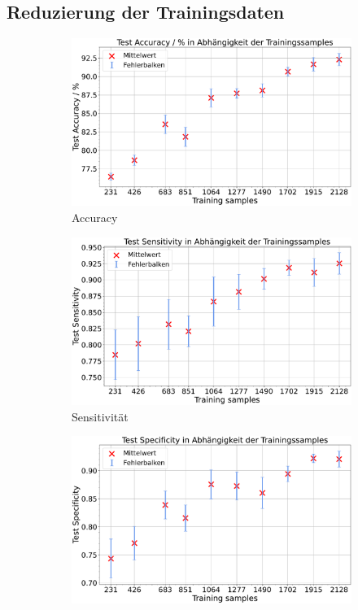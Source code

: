 \subsection{Reduzierung der Trainingsdaten}
\begin{figure}[H]
  \centering
  \begin{subfigure}[b]{0.48\textwidth}
    \centering
    \includegraphics[width=\textwidth]{plots/3-Messungen-Gli-Men_Accuracy_mean.pdf}
    \caption{Accuracy}
    \label{fig:gli-men-acc}
  \end{subfigure}
  \begin{subfigure}[b]{0.48\textwidth}
    \centering
    \includegraphics[width=\textwidth]{plots/3-Messungen-Gli-Men_Sensitivity_mean.pdf}
    \caption{Sensitivität}
    \label{fig:gli-men-sens}
  \end{subfigure}
  \begin{subfigure}[b]{0.48\textwidth}
    \centering
    \includegraphics[width=\textwidth]{plots/3-Messungen-Gli-Men_Specificity_mean.pdf}

\end{subfigure}
\end{figure}
